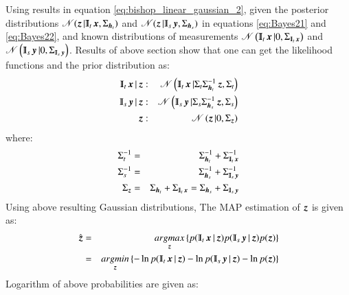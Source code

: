 Using results in equation \ref{eq:bishop_linear_gaussian_2}, given the posterior distributions $ \distr(\mybold{z}|\varmathbb{I}_t\mybold{x},\Sigma_{\mybold{h}_t}) $ and $ \distr(\mybold{z}|\varmathbb{I}_s\mybold{y},\Sigma_{\mybold{h}_s}) $ in equations \ref{eq:Bayes21} and \ref{eq:Bayes22}, and known distributions of measurements $ \distr \left( \varmathbb{I}_t\mybold{x} |0, \Sigma_{\varmathbb{I}_t\mybold{x}} \right)$ and $ \distr \left( \varmathbb{I}_s\mybold{y} |0, \Sigma_{\varmathbb{I}_s\mybold{y}} \right)$. Results of above section show that one can get the likelihood functions and the prior distribution as:
\begin{eqnarray}
		\varmathbb{I}_t \mybold{x}|\mybold{z} :&& \distr \left(\varmathbb{I}_t \mybold{x}|\Sigma_t \Sigma_{\mybold{h}_t}^{-1} \mybold{z},\Sigma_t \right) \nonumber\\
		\varmathbb{I}_s \mybold{y}|\mybold{z} :&& \distr \left(\varmathbb{I}_s \mybold{y}|\Sigma_s \Sigma_{\mybold{h}_s}^{-1} \mybold{z},\Sigma_s \right) \nonumber\\
		\mybold{z} :&& \distr \left(\mybold{z}|0, \Sigma_{\mybold{z}}\right) 
\label{eq:bishop_linear_gaussian_3}	
\end{eqnarray}
where:
\begin{eqnarray}
		\Sigma_t^{-1} =&& \Sigma_{\mybold{h}_t}^{-1} + \Sigma_{\varmathbb{I}_t\mybold{x}}^{-1} \nonumber\\
		\Sigma_s^{-1} =&& \Sigma_{\mybold{h}_s}^{-1} + \Sigma_{\varmathbb{I}_s\mybold{y}}^{-1} \nonumber\\
		\Sigma_{\mybold{z}} =&& \Sigma_{\mybold{h}_t}+\Sigma_{\varmathbb{I}_t\mybold{x}} = \Sigma_{\mybold{h}_s}+\Sigma_{\varmathbb{I}_s\mybold{y}}
\label{eq:bishop_linear_gaussian_4}	
\end{eqnarray}
Using above resulting Gaussian distributions, The MAP estimation of $ \operatorname{\boldsymbol{z}} $ is given as:
\begin{eqnarray}
	\hat{\mybold{z}} =&& \underset{\mybold{z}}{argmax} \left\lbrace  p(\varmathbb{I}_t\mybold{x}|\mybold{z})p(\varmathbb{I}_s\mybold{y}|\mybold{z})p(\mybold{z}) \right\rbrace \nonumber\\
	=&& \underset{\mybold{z}}{argmin} \left\lbrace -\ln p(\varmathbb{I}_t\mybold{x}|\mybold{z}) -\ln p(\varmathbb{I}_s\mybold{y}|\mybold{z}) -\ln p(\mybold{z}) \right\rbrace
\label{eq:bishop_linear_gaussian_5}
\end{eqnarray}
Logarithm of above probabilities are given as:
